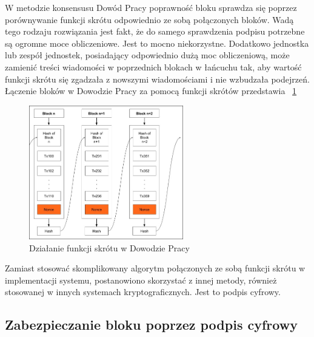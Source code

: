W metodzie konsensusu Dowód Pracy poprawność bloku sprawdza się poprzez porównywanie funkcji skrótu odpowiednio ze sobą połączonych bloków. Wadą tego rodzaju rozwiązania jest fakt, że do samego sprawdzenia podpisu potrzebne są ogromne moce obliczeniowe. Jest to mocno niekorzystne. Dodatkowo jednostka lub zespół jednostek, posiadający odpowiednio dużą moc obliczeniową, może zamienić treści wiadomości w poprzednich blokach w łańcuchu tak, aby wartość funkcji skrótu się zgadzała z nowszymi wiadomościami i nie wzbudzała podejrzeń.
Łączenie bloków w Dowodzie Pracy za pomocą funkcji skrótów przedstawia \figurename{~\ref{fig:ProofOfWorkHash}}
\begin{figure}[h]
    \centering
    \includegraphics[width=0.6\textwidth]{Images/ProofOfWorkHash.jpg}
    \caption{Działanie funkcji skrótu w Dowodzie Pracy}
    \label{fig:ProofOfWorkHash}
\end{figure}

Zamiast stosować skomplikowany algorytm połączonych ze sobą funkcji skrótu w implementacji systemu, postanowiono skorzystać z innej metody, również stosowanej w innych systemach kryptograficznych. Jest to podpis cyfrowy.

\subsection{Zabezpieczanie bloku poprzez podpis cyfrowy}
\label{ssec:ZabezpieczenieBlokuPodpis}

